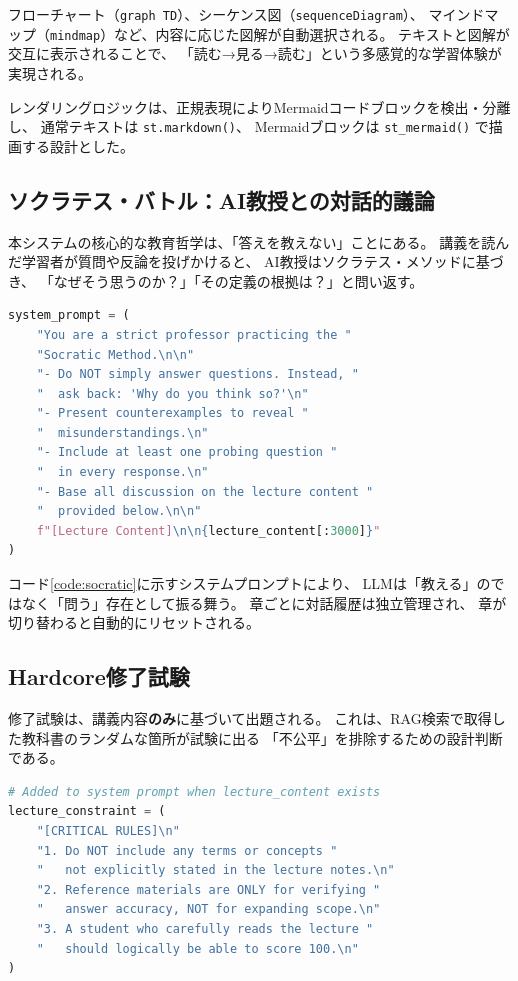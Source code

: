 \documentclass[uplatex, dvipdfmx, a4paper, 11pt]{jsarticle}
\begin{document}
フローチャート（\texttt{graph TD}）、シーケンス図（\texttt{sequenceDiagram}）、
マインドマップ（\texttt{mindmap}）など、内容に応じた図解が自動選択される。
テキストと図解が交互に表示されることで、
「読む→見る→読む」という多感覚的な学習体験が実現される。

レンダリングロジックは、正規表現によりMermaidコードブロックを検出・分離し、
通常テキストは \texttt{st.markdown()}、
Mermaidブロックは \texttt{st\_mermaid()} で描画する設計とした。

\subsection{ソクラテス・バトル：AI教授との対話的議論}
本システムの核心的な教育哲学は、「答えを教えない」ことにある。
講義を読んだ学習者が質問や反論を投げかけると、
AI教授はソクラテス・メソッドに基づき、
「なぜそう思うのか？」「その定義の根拠は？」と問い返す。

\begin{lstlisting}[language=Python, caption=Socratic Dialogue Prompt (src/rag\_pipeline.py), label=code:socratic]
system_prompt = (
    "You are a strict professor practicing the "
    "Socratic Method.\n\n"
    "- Do NOT simply answer questions. Instead, "
    "  ask back: 'Why do you think so?'\n"
    "- Present counterexamples to reveal "
    "  misunderstandings.\n"
    "- Include at least one probing question "
    "  in every response.\n"
    "- Base all discussion on the lecture content "
    "  provided below.\n\n"
    f"[Lecture Content]\n\n{lecture_content[:3000]}"
)
\end{lstlisting}

コード\ref{code:socratic}に示すシステムプロンプトにより、
LLMは「教える」のではなく「問う」存在として振る舞う。
章ごとに対話履歴は独立管理され、
章が切り替わると自動的にリセットされる。

\subsection{Hardcore修了試験}
修了試験は、講義内容\textbf{のみ}に基づいて出題される。
これは、RAG検索で取得した教科書のランダムな箇所が試験に出る
「不公平」を排除するための設計判断である。

\begin{lstlisting}[language=Python, caption=Lecture-Based Exam Constraint, label=code:exam]
# Added to system prompt when lecture_content exists
lecture_constraint = (
    "[CRITICAL RULES]\n"
    "1. Do NOT include any terms or concepts "
    "   not explicitly stated in the lecture notes.\n"
    "2. Reference materials are ONLY for verifying "
    "   answer accuracy, NOT for expanding scope.\n"
    "3. A student who carefully reads the lecture "
    "   should logically be able to score 100.\n"
)
\end{lstlisting}
\end{document}
